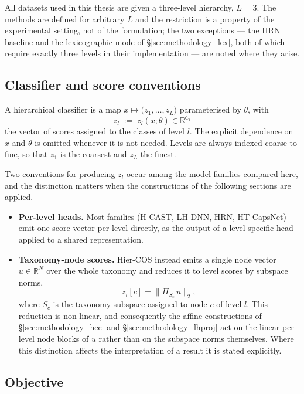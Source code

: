 All datasets used in this thesis are given a three-level hierarchy, $L=3$. The
methods are defined for arbitrary $L$ and the restriction is a property of the
experimental setting, not of the formulation; the two exceptions --- the HRN
baseline and the lexicographic mode of \S\ref{sec:methodology_lex}, both of which
require exactly three levels in their implementation --- are noted where they
arise.

\subsection{Classifier and score conventions}
\label{ssec:problem_scores}

A hierarchical classifier is a map $x\mapsto\big(z_1,\dots,z_L\big)$
parameterised by $\theta$, with
\[
z_l\;:=\;z_l(x;\theta)\in\mathbb{R}^{C_l}
\]
the vector of scores assigned to the classes of level $l$. The explicit
dependence on $x$ and $\theta$ is omitted whenever it is not needed. Levels are
always indexed coarse-to-fine, so that $z_1$ is the coarsest and $z_L$ the
finest.

Two conventions for producing $z_l$ occur among the model families compared here,
and the distinction matters when the constructions of the following sections are
applied.

\begin{itemize}
    \item \textbf{Per-level heads.} Most families (H-CAST, LH-DNN, HRN,
    HT-CapsNet) emit one score vector per level directly, as the output of a
    level-specific head applied to a shared representation.
    \item \textbf{Taxonomy-node scores.} Hier-COS instead emits a single node
    vector $u\in\mathbb{R}^{N}$ over the whole taxonomy and reduces it to level
    scores by subspace norms,
    \[
    z_l[c]=\big\lVert \Pi_{S_c}\,u\big\rVert_2,
    \]
    where $S_c$ is the taxonomy subspace assigned to node $c$ of level $l$. This
    reduction is non-linear, and consequently the affine constructions of
    \S\ref{sec:methodology_hcc} and \S\ref{sec:methodology_lhproj} act on the
    linear per-level node blocks of $u$ rather than on the subspace norms
    themselves. Where this distinction affects the interpretation of a result it
    is stated explicitly.
\end{itemize}

\subsection{Objective}
\label{ssec:problem_objective}

